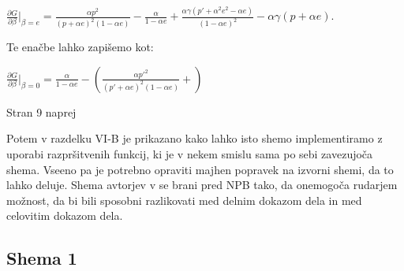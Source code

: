\documentclass{acm_proc_article-sp}
\begin{document}
$\frac{\partial G}{\partial \beta}|_{\beta=e} = 
\frac{\alpha p^2}{(p+\alpha e)^2(1-\alpha e)} - \frac{\alpha}{1 - \alpha e} +
\frac{\alpha\gamma(p'+\alpha^2 e^2 -\alpha e)}
{(1 - \alpha e)^2} -
\alpha\gamma(p+ \alpha e)$.\newline

Te enačbe lahko zapišemo kot:\newline

$\frac{\partial G}{\partial \beta}|_{\beta=0} =
\frac{\alpha}{1-\alpha e} - (
\frac{\alpha p'^2}{(p' + \alpha e)^2(1-\alpha e)} + )$

\newpage 
Stran 9 naprej

Potem v razdelku VI-B je prikazano kako lahko isto shemo implementiramo z uporabi razpršitvenih funkcij, ki je v nekem smislu sama po sebi zavezujoča shema. Vseeno pa je potrebno opraviti majhen popravek na izvorni shemi, da to lahko deluje. Shema avtorjev v \cite{originalarticle} se brani pred NPB tako, da onemogoča rudarjem možnost, da bi bili sposobni razlikovati med delnim dokazom dela in med celovitim dokazom dela.

\subsection{Shema 1}
\end{document}
